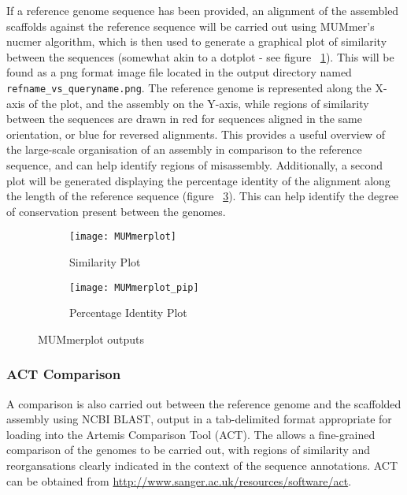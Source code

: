 \documentclass[a4paper,10pt]{article}
\begin{document}
If a reference genome sequence has been  provided, an alignment of the
assembled scaffolds against the reference sequence will be carried out using
MUMmer's nucmer algorithm, which is then used to generate a graphical plot of
similarity between the sequences (somewhat akin to a dotplot - see figure
~\ref{fig:mummerplot}). This will be found as a png format image file located
in the output directory named {\tt refname\_vs\_queryname.png}. The reference
genome is represented along the X-axis of the plot, and the assembly on the
Y-axis, while regions of similarity between the sequences are drawn in red for
sequences aligned in the same orientation, or blue for reversed alignments.
This provides a useful overview of the large-scale organisation of an assembly
in comparison to the reference sequence, and can help identify regions of
misassembly. Additionally, a second plot will be generated displaying the
percentage identity of the alignment along the length of the reference sequence
(figure ~\ref{fig:mummerplotpip}). This can help identify the degree of
conservation present between the genomes.

\begin{figure}[htbp]
  \begin{subfigure}[b]{0.45\textwidth}
    \texttt{[image: MUMmerplot]}
    \caption{Similarity Plot}
    \label{fig:mummerplot}
  \end{subfigure}
  \hfill
  \begin{subfigure}[b]{0.45\textwidth}
    \texttt{[image: MUMmerplot\_pip]}
    \caption{Percentage Identity Plot}
    \label{fig:mummerplotpip}
  \end{subfigure}
  \caption{MUMmerplot outputs}
\end{figure}

\subsubsection{ACT Comparison}

A comparison is also carried out between the reference genome and the
scaffolded assembly using NCBI BLAST, output in a tab-delimited format
appropriate for loading into the Artemis Comparison Tool (ACT). The allows a
fine-grained comparison of the genomes to be carried out, with regions of
similarity and reorgansations clearly indicated in the context of the sequence
annotations. ACT can be obtained from 
\href{http://www.sanger.ac.uk/resource/software/act}{http://www.sanger.ac.uk/resources/software/act}. 
\end{document}
